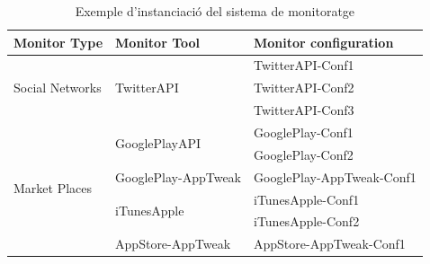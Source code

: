 \begin{table}[htb]
\centering
\label{InstanciacioOrchestrator}
\begin{tabular}{|l|l|l|}
\hline
\textbf{Monitor Type}            & \textbf{Monitor Tool}          & \textbf{Monitor configuration} \\ \hline
\multirow{3}{*}{Social Networks} & \multirow{3}{*}{TwitterAPI}    & TwitterAPI-Conf1               \\ \cline{3-3} 
                                 &                                & TwitterAPI-Conf2               \\ \cline{3-3} 
                                 &                                & TwitterAPI-Conf3               \\ \hline
\multirow{6}{*}{Market Places}   & \multirow{2}{*}{GooglePlayAPI} & GooglePlay-Conf1               \\ \cline{3-3} 
                                 &                                & GooglePlay-Conf2               \\ \cline{2-3} 
                                 & GooglePlay-AppTweak            & GooglePlay-AppTweak-Conf1      \\ \cline{2-3} 
                                 & \multirow{2}{*}{iTunesApple}   & iTunesApple-Conf1              \\ \cline{3-3} 
                                 &                                & iTunesApple-Conf2              \\ \cline{2-3} 
                                 & AppStore-AppTweak              & AppStore-AppTweak-Conf1        \\ \hline
\end{tabular}
\caption{Exemple d'instanciació del sistema de monitoratge}
\end{table}

